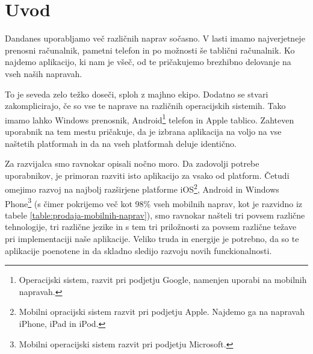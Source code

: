 \graphicspath{{img/}}





\chapter{Uvod}
\label{chap:introduction}


Dandanes uporabljamo več različnih naprav sočasno. V lasti imamo najverjetneje prenosni računalnik, pametni telefon in po možnosti še tablični računalnik. Ko najdemo aplikacijo, ki nam je všeč, od te pričakujemo brezhibno delovanje na vseh naših napravah.

To je seveda zelo težko doseči, sploh z majhno ekipo. Dodatno se stvari zakomplicirajo, če so vse te naprave na različnih operacijskih sistemih. Tako imamo lahko Windows prenosnik, Android\footnote{Operacijski sistem, razvit pri podjetju Google, namenjen uporabi na mobilnih napravah.} telefon in Apple tablico. Zahteven uporabnik na tem mestu pričakuje, da je izbrana aplikacija na voljo na vse naštetih platformah in da na vseh platformah deluje identično.

Za razvijalca smo ravnokar opisali nočno moro. Da zadovolji potrebe uporabnikov, je primoran razviti isto aplikacijo za vsako od platform. Četudi omejimo razvoj na najbolj razširjene platforme iOS\footnote{Mobilni opracijski sistem razvit pri podjetju Apple. Najdemo ga na napravah iPhone, iPad in iPod.}, Android in Windows Phone\footnote{Mobilni operacijski sistem razvit pri podjetju Microsoft.} (s čimer pokrijemo več kot 98\% vseh mobilnih naprav, kot je razvidno iz tabele \ref{table:prodaja-mobilnih-naprav}), smo ravnokar našteli tri povsem različne tehnologije, tri različne jezike in s tem tri priložnosti za povsem različne težave pri implementaciji naše aplikacije. Veliko truda in energije je potrebno, da so te aplikacije poenotene in da skladno sledijo razvoju novih funckionalnosti.

